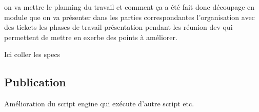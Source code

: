 on va mettre le planning du travail et comment ça a été fait
donc découpage en module que on va présenter dans les parties correspondantes
l'organisation avec des tickets
les phases de travail
présentation pendant les réunion dev qui permettent de mettre en exerbe des
points à améliorer.




Ici coller les specs




\subsection{Publication}

Amélioration du script engine qui exécute d'autre script etc.

